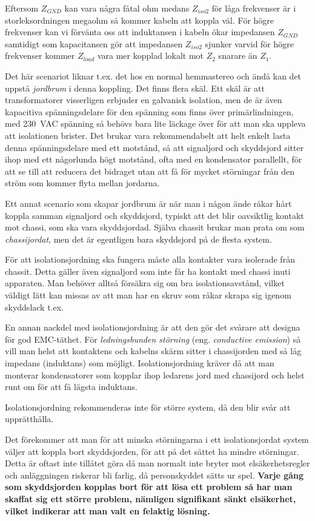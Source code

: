 Eftersom \(Z_{GND}\) kan vara några fåtal ohm medans \(Z_{iso2}\) för låga
frekvenser är i storleksordningen megaohm så kommer kabeln att koppla väl.
För högre frekvenser kan vi förvänta oss att induktansen i kabeln ökar
impedansen \(Z_{GND}\) samtidigt som kapacitansen gör att impedansen
\(Z_{iso2}\) sjunker varvid för högre frekvenser kommer \(Z_{load}\) vara mer
kopplad lokalt mot \(Z_{2}\) snarare än \(Z_{1}\).

Det här scenariot liknar t.ex. det hos en normal hemmastereo och ändå kan det
uppstå \emph{jordbrum} i denna koppling.
Det finns flera skäl.
Ett skäl är att transformatorer visserligen erbjuder en galvanisk isolation,
men de är även kapacitiva spänningsdelare för den spänning som finns över
primärlindningen, med 230~VAC spänning så behövs bara lite läckage över för att
man ska uppleva att isolationen brister.
Det brukar vara rekommendabelt att helt enkelt lasta denna spänningsdelare med
ett motstånd, så att signaljord och skyddsjord sitter ihop med ett någorlunda
högt motstånd, ofta med en kondensator parallellt, för att se till att reducera
det bidraget utan att få för mycket störningar från den ström som kommer flyta
mellan jordarna.

Ett annat scenario som skapar jordbrum är när man i någon ände råkar hårt
koppla samman signaljord och skyddsjord, typiskt att det blir oavsiktlig
kontakt mot chassi, som ska vara skyddsjordad.
Själva chassit brukar man prata om som \emph{chassijordat}, men det är
egentligen bara skyddsjord på de flesta system.

För att isolationsjordning ska fungera måste alla kontakter vara isolerade
från chassit.
Detta gäller även signaljord som inte får ha kontakt med chassi inuti apparaten.
Man behöver alltså försäkra sig om bra isolationsavstånd, vilket väldigt lätt
kan missas av att man har en skruv som råkar skrapa sig igenom skyddslack t.ex.

En annan nackdel med isolationsjordning är att den gör det svårare att designa
för god EMC-täthet.
För \emph{ledningsbunden störning} (eng. \emph{conductive emission}) så vill
man helst att kontaktens och kabelns skärm sitter i chassijorden med så låg
impedans (induktans) som möjligt.
Isolationsjordning kräver då att man monterar kondensatorer som kopplar ihop
ledarens jord med chassijord och helst runt om för att få lägsta induktans.

Isolationsjordning rekommenderas inte för större system, då den blir svår
att upprätthålla.

Det förekommer att man för att minska störningarna i ett isolationsjordat
system väljer att koppla bort skyddsjorden, för att på det sättet ha mindre
störningar.
Detta är oftast inte tillåtet göra då man normalt inte bryter mot
elsäkerhetsregler och anläggningen riskerar bli farlig, då personskyddet
sätts ur spel.
\textbf{Varje gång som skyddsjorden kopplas bort för att lösa ett problem så
  har man skaffat sig ett större problem, nämligen signifikant sänkt
  elsäkerhet, vilket indikerar att man valt en felaktig lösning.}

